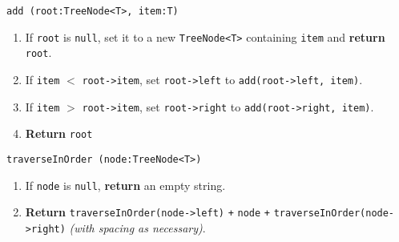 \vspace{5mm}
\texttt{add (root:TreeNode<T>, item:T)}
\begin{enumerate}
	\item If \texttt{root} is \texttt{null}, set it to a new \texttt{TreeNode<T>} containing \texttt{item} and
		\textbf{return} \texttt{root}.
	\item If \texttt{item} $<$ \texttt{root->item}, set \texttt{root->left} to \texttt{add(root->left, item)}.
	\item If \texttt{item} $>$ \texttt{root->item}, set \texttt{root->right} to \texttt{add(root->right, item)}.
	\item \textbf{Return} \texttt{root}
\end{enumerate}
\vspace{5mm}
\texttt{traverseInOrder (node:TreeNode<T>)}
\begin{enumerate}
	\item If \texttt{node} is \texttt{null}, \textbf{return} an empty string.
	\item \textbf{Return} \texttt{traverseInOrder(node->left)} \texttt{+} \texttt{node} \texttt{+} \texttt{traverseInOrder(node->right)} 
		\textit{(with spacing as necessary)}.
\end{enumerate}

\sourcecode




